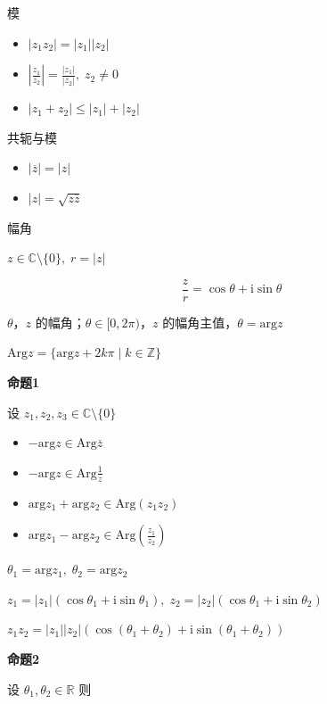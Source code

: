 模

\begin{itemize}
\tightlist
\item
  \(|z_{1}z_{2}|=|z_{1}||z_{2}|\)
\item
  \(| \frac{z_{1}}{z_{2}} |=\frac{|z_{1}|}{|z_{2}|}, \; z_{2}\neq 0\)
\item
  \(|z_{1}+z_{2}|\leq|z_{1}|+|z_{2}|\)
\end{itemize}

共轭与模

\begin{itemize}
\tightlist
\item
  \(|\overline{z}|=|z|\)
\item
  \(|z|=\sqrt{ z\overline{z} }\)
\end{itemize}

幅角

\(z \in \mathbb{C}\setminus \{  0 \}, \; r=|z|\)

\[
\frac{z}{r}=\cos \theta+\mathrm{i}\sin \theta
\]

\(\theta\)，\(z\) 的幅角；\(\theta \in [0, 2\pi)\)，\(z\)
的幅角主值，\(\theta=\mathrm{arg}z\)

\(\mathrm{Arg} z=\{ \mathrm{arg}z+2k\pi \mid k \in \mathbb{Z}\}\)

\textbf{命题1}

设 \(z_{1},z_{2},z_{3}\in \mathbb{C} \setminus \{ 0 \}\)

\begin{itemize}
\tightlist
\item
  \(-\mathrm{arg}z\in \mathrm{Arg}\overline{z}\)
\item
  \(-\mathrm{arg}z\in \mathrm{Arg} \frac{1}{z}\)
\item
  \(\mathrm{arg}z_{1}+\mathrm{arg}z_{2}\in \mathrm{Arg}(z_{1}z_{2})\)
\item
  \(\mathrm{arg}z_{1}-\mathrm{arg}z_{2}\in \mathrm{Arg}\left( \frac{z_{1}}{z_{2}} \right)\)
\end{itemize}

\(\theta_{1} = \mathrm{arg}z_{1}, \;\theta_{2}=\mathrm{arg}z_{2}\)

\(z_{1}=|z_{1}|(\cos \theta_{1}+\mathrm{i}\sin \theta_{1}),\;z_{2}=|z_{2}|(\cos \theta_{1}+\mathrm{i}\sin \theta_{2})\)

\(z_{1}z_{2}=|z_{1}||z_{2}|(\cos(\theta_{1}+\theta_{2})+\mathrm{i}\sin(\theta_{1}+\theta_{2}))\)

\textbf{命题2}

设 \(\theta_{1}, \theta_{2} \in \mathbb{R}\) 则


